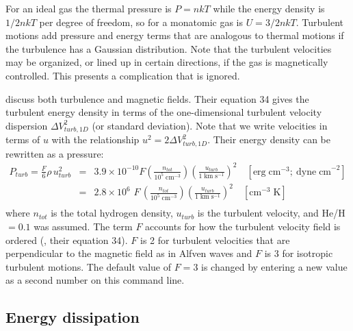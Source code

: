 For an ideal gas the thermal pressure is $P = nkT$
while the energy density is $1/2 nkT$
per degree of freedom, so for a monatomic gas is $U = 3/2 nkT$.
Turbulent motions add pressure and energy terms that are analogous
to thermal motions if the turbulence has a Gaussian distribution.
Note
that the turbulent velocities may be organized, or lined up in certain
directions, if the gas is magnetically controlled.
This presents a
complication that is ignored.

\citet{HeilesTroland2005} discuss both turbulence and magnetic fields.
Their equation 34 gives the turbulent energy density in terms of the
one-dimensional turbulent velocity dispersion $\Delta V_{turb,1D}^2 $
(or standard deviation).
Note that we write velocities in terms of $u$
with the relationship $u^2  = 2\Delta V_{turb,1D}^2 $.
Their energy density can be rewritten as a pressure:
\begin{equation}
\begin{array}{ccl}
 P_{turb}  = \frac{F}{6}\rho \,u_{turb}^2&  =& 3.9 \times 10^{ - 10} F\left(
{\frac{{n_{tot} }}{{10^5 \;{\mathrm{cm}}^{ - 3} }}} \right)\left(
{\frac{{u_{turb} }}{{1\;{\mathrm{km}}\;{\mathrm{s}}^{ - 1} }}} \right)^2 \quad \left[
{{\mathrm{erg\; cm}}^{{\mathrm{ - 3}}} {\mathrm{;\ dyne\; cm}}^{ - 2}} \right] \\
&  =& 2.8 \times 10^6 \,\,F\,\left( {\frac{{n_{tot} }}{{10^5 \;{\mathrm{cm}}^{
- 3} }}} \right)\left( {\frac{{u_{turb} }}{{1\;{\mathrm{km}}\;{\mathrm{s}}^{ - 1}
}}} \right)^2 \quad \left[ {{\mathrm{cm}}^{ - 3} \;{\mathrm{K}}} \right] \\
 \end{array}
\end{equation}
where $n_{tot}$ is the total hydrogen density,
$u_{turb}$ is the turbulent velocity,
and He/H$ = 0.1$ was assumed.
The term $F$ accounts for how the turbulent
velocity field is ordered (\citealp{HeilesTroland2005}, their equation 34).
$F$ is 2 for turbulent velocities that are perpendicular to
the magnetic field
as in Alfven waves and $F$ is 3 for isotropic turbulent motions.
The default
value of $F = 3$ is changed by entering a new value as a second number on
this command line.

\subsection{Energy dissipation}

